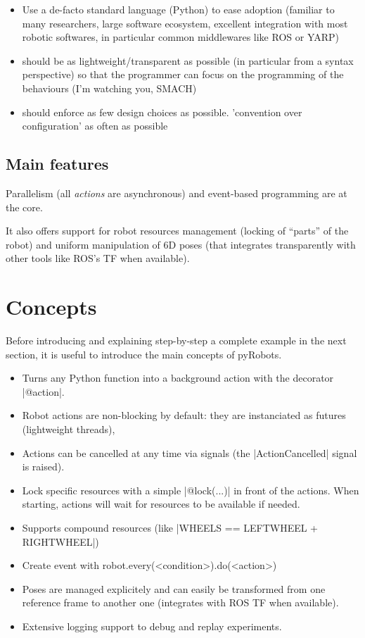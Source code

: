 \documentclass[a4paper, 10pt, conference]{ieeeconf}      %
\newcommand{\pyRobots}{{{\sc pyRobots}}}
\begin{document}
\begin{itemize}
    \item Use a de-facto standard language (Python) to ease adoption (familiar to
        many researchers, large software ecosystem, excellent integration with
        most robotic softwares, in particular common middlewares like ROS or
        YARP)
    \item should be as lightweight/transparent as possible (in particular from a
        syntax perspective) so that the
        programmer can focus on the programming of the behaviours (I'm
        watching you, SMACH)
    \item should enforce as few design choices as possible. 'convention over
        configuration' as often as possible
\end{itemize}

\subsection{Main features}

Parallelism (all \emph{actions} are asynchronous) and event-based programming
are at the core.

It also offers support for robot resources management (locking of ``parts'' of
the robot) and uniform manipulation of 6D poses (that integrates transparently
with other tools like ROS's TF when available).

\section{Concepts}

Before introducing and explaining step-by-step a complete example in the next
section, it is useful to introduce the main concepts of \pyRobots.


\begin{itemize}
    \item Turns any Python function into a background action with the decorator
        \python|@action|.
    \item Robot actions are non-blocking by default: they are instanciated as
        futures (lightweight threads),
    \item Actions can be cancelled at any time via signals (the
        \python|ActionCancelled| signal is raised).
    \item Lock specific resources with a simple \python|@lock(...)| in front of the
        actions. When starting, actions will wait for resources to be
        available if needed.
    \item Supports compound resources (like \python|WHEELS == LEFTWHEEL + RIGHTWHEEL|)
    \item Create event with robot.every(<condition>).do(<action>)
    \item Poses are managed explicitely and can easily be
        transformed from one reference frame to another one
        (integrates with ROS TF when available).
    \item Extensive logging support to debug and replay
        experiments.
\end{itemize}
\end{document}

